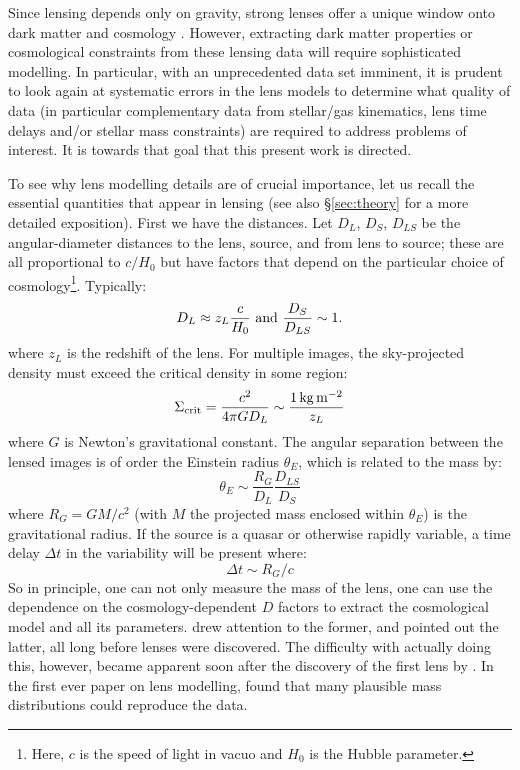 \documentclass[galley,usenatbib]{mn2e}
\begin{document}
Since lensing depends only on gravity, strong lenses offer a unique window onto
dark matter and cosmology \citep{2010CQGra..27w3001B,2012arXiv1206.1225A}.
However, extracting dark matter properties or cosmological constraints from
these lensing data will require sophisticated modelling. In particular, with an
unprecedented data set imminent, it is prudent to look again at systematic
errors in the lens models to determine what quality of data (in particular
complementary data from stellar/gas kinematics, lens time delays and/or stellar
mass constraints) are required to address problems of interest. It is towards
that goal that this present work is directed.

To see why lens modelling details are of crucial importance, let us
recall the essential quantities that appear in lensing (see also \S\ref{sec:theory} for a more detailed exposition). First we have the distances. Let $D_L$, $D_S$, $D_{LS}$ be the
angular-diameter distances to the lens, source, and from lens to
source; these are all proportional to $c/H_0$ but have factors
that depend on the particular choice of cosmology\footnote{Here, $c$ is the speed of light in vacuo and $H_0$ is the Hubble parameter.}.  Typically:
%
\begin{equation}
D_L \approx z_L \frac c{H_0}\ \hbox{and}\ \frac{D_S}{D_{LS}} \sim 1.
\end{equation}
where $z_L$ is the redshift of the lens. 
%
For multiple images, the sky-projected density must exceed the critical
density in some region:
%
\begin{equation}
\Sigma_\mathrm{crit} = \frac{c^2}{4\pi G D_L} \sim \frac{1\rm\,kg\,m^{-2}}{z_L}
\end{equation}
where $G$ is Newton's gravitational constant. 
%
The angular separation between the lensed images is of order
the Einstein radius $\theta_E$, which is related to
the mass by:
%
\begin{equation}
\theta_E \sim \frac{R_G}{D_L} \frac{D_{LS}}{D_S}
\end{equation}
%
where $R_G = GM/c^2$ (with $M$ the projected mass enclosed within $\theta_E$)
is the gravitational radius. If the source is a quasar or otherwise rapidly
variable, a time delay $\Delta t$ in the variability will be present where:
%
\begin{equation}
\Delta t \sim R_G/c
\end{equation}
%
So in principle, one can not only measure the mass of the lens, one can use the
dependence on the cosmology-dependent $D$ factors to extract the cosmological
model and all its parameters.  \cite{1937ApJ....86..217Z} drew attention to the
former, and \cite{1964MNRAS.128..307R,1966MNRAS.132..101R} pointed out the
latter, all long before lenses were discovered.  The difficulty with actually
doing this, however, became apparent soon after the discovery of the first lens
by \cite{1979Natur.279..381W}.  In the first ever paper on lens modelling,
\cite{1981ApJ...244..736Y} found that many plausible mass distributions could
reproduce the data.
\end{document}

